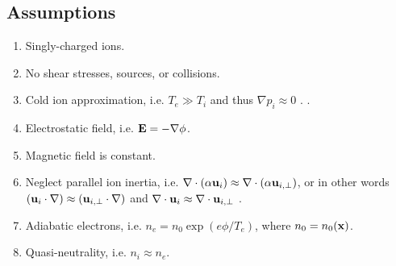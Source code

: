 \documentclass[oneside,a4paper,11pt]{report}
\begin{document}
\subsection{Assumptions}
\begin{enumerate}
    \item Singly-charged ions. \label{it:single_charge_ions}
    \item No shear stresses, sources, or collisions. \label{it:no_shear_source_coll}
    \item Cold ion approximation, i.e. $T_e \gg T_i$ and thus $\nabla p_i \approx 0$ \cite{hasegawa1977}. \label{it:cold}.
    \item Electrostatic field, i.e. $\mathbf{E} = - \nabla \phi$. \label{it:electrostatic}
    \item Magnetic field is constant.
    \item Neglect parallel ion inertia, i.e. $\nabla \cdot (\alpha \mathbf{u}_i) \approx \nabla \cdot (\alpha \mathbf{u}_{i,\perp})$, or in other words $(\mathbf{u}_i \cdot \nabla) \approx (\mathbf{u}_{i,\perp} \cdot \nabla)$ and $\nabla \cdot \mathbf{u}_i \approx \nabla \cdot \mathbf{u}_{i,\perp}$ \cite{hasegawa1977}. \label{it:par_ion}
    \item Adiabatic electrons, i.e. $n_e = n_0 \exp (e\phi/T_e)$, where $n_0 = n_0(\mathbf{x})$. \label{it:adiabatic}
    \item Quasi-neutrality, i.e. $n_i \approx n_e$. \label{it:quasineutrality}
\end{enumerate}

\end{document}
